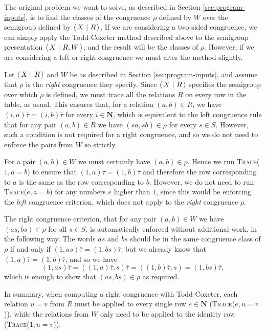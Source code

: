 The original problem we want to solve, as described in Section
\ref{sec:program-inputs}, is to find the classes of the congruence $\rho$
defined by $W$ over the semigroup defined by $\left\langle\,X ~\middle|~ R\,\right\rangle$.  If we are considering
a two-sided congruence, we can simply apply the Todd-Coxeter method described
above to the semigroup presentation $\left\langle\,X ~\middle|~ R,W\,\right\rangle$, and the result will be the
classes of $\rho$.  However, if we are considering a left or right congruence we
must alter the method slightly.

Let $\left\langle\,X ~\middle|~ R\,\right\rangle$ and $W$ be as described in Section \ref{sec:program-inputs}, and
assume that $\rho$ is the \textit{right} congruence they specify.  Since
$\left\langle\,X ~\middle|~ R\,\right\rangle$ specifies the semigroup over which $\rho$ is defined, we must trace
all the relations $R$ on every row in the table, as usual.  This ensures that,
for a relation $(a,b) \in R$, we have $(i, a)\bar\tau = (i, b)\bar\tau$ for
every $i \in \mathbf{N}$, which is equivalent to the left congruence rule that
for any pair $(a,b) \in R$ we have $(sa, sb) \in \rho$ for every $s \in S$.
However, such a condition is not required for a right congruence, and so we do
not need to enforce the pairs from $W$ so strictly.

For a pair $(a,b) \in W$ we must certainly have $(a,b) \in \rho$.  Hence we run
\textsc{Trace($1, a=b$)} to ensure that $(1,a)\bar\tau = (1,b)\bar\tau$ and
therefore the row corresponding to $a$ is the same as the row corresponding to
$b$.  However, we do not need to run \textsc{Trace($e, a=b$)} for any numbers
$e$ higher than $1$, since this would be enforcing the \textit{left} congruence
criterion, which does not apply to the \textit{right} congruence $\rho$.

The right congruence criterion, that for any pair $(a,b) \in W$ we have
$(as, bs) \in \rho$ for all $s \in S$, is automatically enforced without
additional work, in the following way.  The words $as$ and $bs$ should be in the
same congruence class of $\rho$ if and only if
$(1, as)\bar\tau = (1, bs)\bar\tau$; but we already know that
$(1, a)\bar\tau = (1, b)\bar\tau$, and so we have
$$(1, as)\bar\tau
= ((1, a)\bar\tau, s)\bar\tau
= ((1, b)\bar\tau, s)
= (1, bs)\bar\tau,$$
which is enough to show that $(as, bs) \in \rho$ as required.

In summary, when computing a right congruence with Todd-Coxeter, each relation
$u=v$ from $R$ must be applied to every single row $e \in \mathbf{N}$
(\textsc{Trace($e, u=v$)}), while the relations from $W$ only need to be applied
to the identity row (\textsc{Trace($1, u=v$)}).

